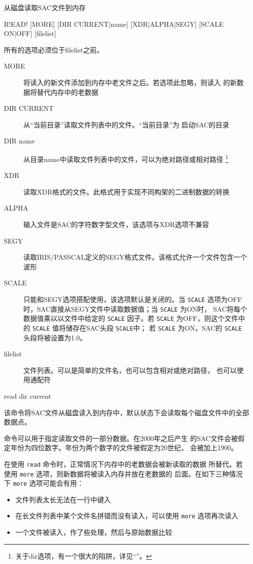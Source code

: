 \label{cmd:read}

从磁盘读取SAC文件到内存

\begin{SACSTX}
R!EAD! [MORE] [DIR CURRENT|name] [XDR|ALPHA|SEGY] [SCALE ON|OFF] [filelist]
\end{SACSTX}
所有的选项必须位于filelist之前。

\begin{description}
\item [MORE] 将读入的新文件添加到内存中老文件之后。若选项此忽略，则读入
    的新数据将替代内存中的老数据
\item [DIR CURRENT] 从``当前目录''读取文件列表中的文件。``当前目录''为
    启动SAC的目录
\item [DIR name] 从目录name中读取文件列表中的文件，可以为绝对路径或相对路径
    \footnote{关于dir选项，有一个很大的陷阱，详见``''。}
\item [XDR] 读取XDR格式的文件。此格式用于实现不同构架的二进制数据的转换
\item [ALPHA] 输入文件是SAC的字符数字型文件，该选项与XDR选项不兼容
\item [SEGY] 读取IRIS/PASSCAL定义的SEGY格式文件。该格式允许一个文件包含一个波形
\item [SCALE] 只能和SEGY选项搭配使用，该选项默认是关闭的。当 \texttt{SCALE}
    选项为OFF时，SAC直接从SEGY文件中读取数据值；当 \texttt{SCALE} 为ON时，
    SAC将每个数据值乘以以文件中给定的 \texttt{SCALE} 因子。若 \texttt{SCALE}
    为OFF，则这个文件中的 \texttt{SCALE} 值将储存在SAC头段 \texttt{SCALE}中；
    若 \texttt{SCALE} 为ON，SAC的 \texttt{SCALE} 头段将被设置为1.0。
\item [filelist] 文件列表。可以是简单的文件名，也可以包含相对或绝对路径，
    也可以使用通配符
\end{description}

\begin{SACDFT}
read dir current
\end{SACDFT}

该命令将SAC文件从磁盘读入到内存中，默认状态下会读取每个磁盘文件中的全部
数据点。

 命令可以用于指定读取文件的一部分数据。在2000年之后产生
的SAC文件会被假定年份为四位数字。年份为两个数字的文件被假定为20世纪，
会被加上1900。

在使用 \texttt{read} 命令时，正常情况下内存中的老数据会被新读取的数据
所替代。若使用 \texttt{more} 选项，则新数据将被读入内存并放在老数据的
后面。在如下三种情况下 \texttt{more} 选项可能会有用：
\begin{itemize}
\item 文件列表太长无法在一行中键入
\item 在长文件列表中某个文件名拼错而没有读入，可以使用 \texttt{more} 选项再次读入
\item 一个文件被读入，作了些处理，然后与原始数据比较
\end{itemize}

